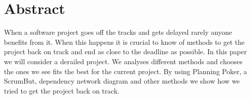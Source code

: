 \section*{Abstract}
When a software project goes off the tracks and gets delayed rarely anyone benefits from it. When this happens it is crucial to know of methods to get the project back on track and end as close to the deadline as possible. In this paper we will consider a derailed project. We analyses different methods and chooses the ones we see fits the best for the current project. By using Planning Poker, a ScrumBut, dependency network diagram and other methods we show how we tried to get the project back on track.
\newpage